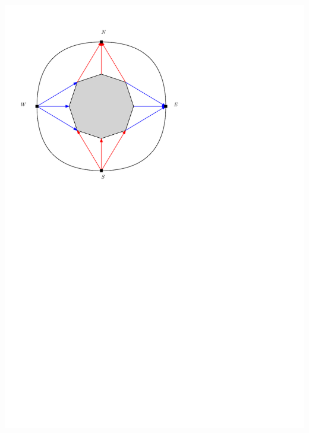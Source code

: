 \documentclass[a4paper]{article}
\begin{document}
\clearpage%
\includegraphics[width =\textwidth]{./rectangularDuals/img/exteriorCondition.pdf}
\clearpage%
\end{document}

